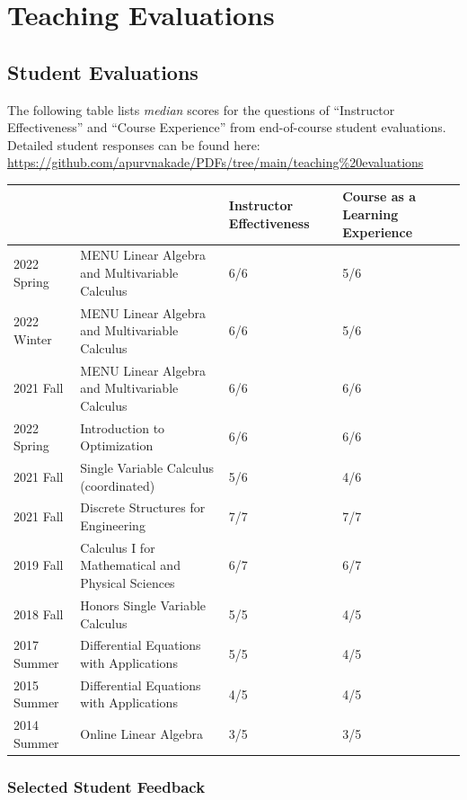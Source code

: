 \documentclass[
]{report}
\begin{document}
\hypertarget{teaching-evaluations}{%
\chapter{Teaching Evaluations}\label{teaching-evaluations}}

\hypertarget{student-evaluations}{%
\section{Student Evaluations}\label{student-evaluations}}

The following table lists \emph{median} scores for the questions of ``Instructor Effectiveness'' and ``Course Experience'' from end-of-course student evaluations. Detailed student responses can be found here: \url{https://github.com/apurvnakade/PDFs/tree/main/teaching\%20evaluations}

\begin{longtable}[]{@{}llll@{}}
\toprule
& & Instructor Effectiveness & Course as a Learning Experience \\
\midrule
\endhead
2022 Spring & MENU Linear Algebra and Multivariable Calculus & 6/6 & 5/6 \\
2022 Winter & MENU Linear Algebra and Multivariable Calculus & 6/6 & 5/6 \\
2021 Fall & MENU Linear Algebra and Multivariable Calculus & 6/6 & 6/6 \\
2022 Spring & Introduction to Optimization & 6/6 & 6/6 \\
2021 Fall & Single Variable Calculus (coordinated) & 5/6 & 4/6 \\
2021 Fall & Discrete Structures for Engineering & 7/7 & 7/7 \\
2019 Fall & Calculus I for Mathematical and Physical Sciences & 6/7 & 6/7 \\
2018 Fall & Honors Single Variable Calculus & 5/5 & 4/5 \\
2017 Summer & Differential Equations with Applications & 5/5 & 4/5 \\
2015 Summer & Differential Equations with Applications & 4/5 & 4/5 \\
2014 Summer & Online Linear Algebra & 3/5 & 3/5 \\
\bottomrule
\end{longtable}

\hypertarget{selected-student-feedback}{%
\subsection{Selected Student Feedback}\label{selected-student-feedback}}
\end{document}
